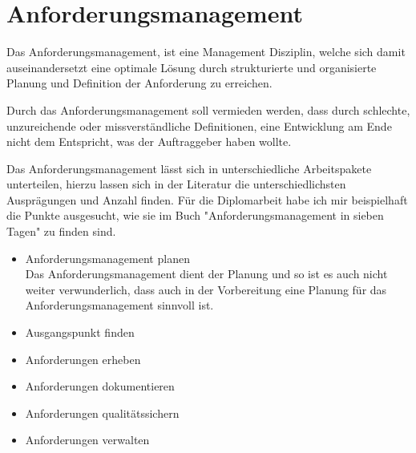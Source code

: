 \section{Anforderungsmanagement}

Das Anforderungsmanagement, ist eine Management Disziplin, welche sich damit auseinandersetzt eine optimale Lösung durch strukturierte und organisierte Planung und Definition der Anforderung zu erreichen.

Durch das Anforderungsmanagement soll vermieden werden, dass durch schlechte, unzureichende oder missverständliche Definitionen, eine Entwicklung am Ende nicht dem Entspricht, was der Auftraggeber haben wollte.

Das Anforderungsmanagement lässt sich in unterschiedliche Arbeitspakete unterteilen, hierzu lassen sich in der Literatur die unterschiedlichsten Ausprägungen und Anzahl finden. Für die Diplomarbeit habe ich mir beispielhaft die Punkte ausgesucht, wie sie im Buch "Anforderungsmanagement in sieben Tagen"\autocite[30-31]{AMin.sieben.T} zu finden sind.

\begin{itemize}
\item Anforderungsmanagement planen \\
		Das Anforderungsmanagement dient der Planung und so ist es auch nicht weiter
		verwunderlich, dass auch in der Vorbereitung eine Planung für das Anforderungsmanagement
		sinnvoll ist.

\item Ausgangspunkt finden
\item Anforderungen erheben
\item Anforderungen dokumentieren
\item Anforderungen qualitätssichern
\item Anforderungen verwalten
\end{itemize}


